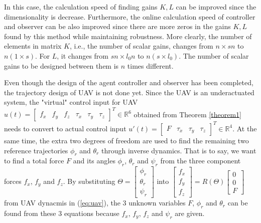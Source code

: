 \documentclass{ieeeaccess}
\newtheorem{remark}{Remark}
\begin{document}
In this case, the calculation speed of finding gains $K,L$ can be improved since the dimensionality is decrease. Furthermore, the online calculation speed of controller and observer can be also improved since there are more zeros in the gains $K,L$ found by this method while maintaining robustness. More clearly, the number of elements in matrix $K$, i.e., the number of scalar gains, changes from $n\times sn$ to $n(1\times s)$. For $L$, it changes from $sn\times l_0n$ to $n(s\times l_0)$. The number of scalar gains to be designed between them is $n$ times different.

Even though the design of the agent controller and observer has been completed, the trajectory design of UAV is not done yet. Since the UAV is an underactuated system, the "virtual" control input for UAV $u(t)=\begin{bmatrix}
    f_x & f_y & f_z & \tau_x & \tau_y & \tau_z 
\end{bmatrix}^T\in\mathbb{R}^6$ obtained from Theorem \ref{theorem1} needs to convert to actual control input $u'(t)=\begin{bmatrix}
    F & \tau_x & \tau_y & \tau_z 
\end{bmatrix}^T\in\mathbb{R}^4$. At the same time, the extra two degrees of freedom are used to find the remaining two reference trajectories $\phi_r$ and $\theta_r$ through inverse dynamics. That is to say, we want to find a total force $F$ and its angles $\phi_r$, $\theta_r$ and $\psi_r$ from the three component forces $f_x$, $f_y$ and $f_z$. By substituting $\Theta=\begin{bmatrix}
    \phi_r \\ \theta_r \\ \psi_r
\end{bmatrix}$ into $\begin{bmatrix}
        f_x \\ f_y \\ f_z
    \end{bmatrix} = R(\Theta)\begin{bmatrix}
        0 \\ 0 \\ F
\end{bmatrix} $ from UAV dynacmis in (\ref{eq:uav}), the 3 unknown variables $F$, $\phi_r$ and $\theta_r$ can be found from these 3 equations because $f_x$, $f_y$, $f_z$ and $\psi_r$ are given.
\end{document}
